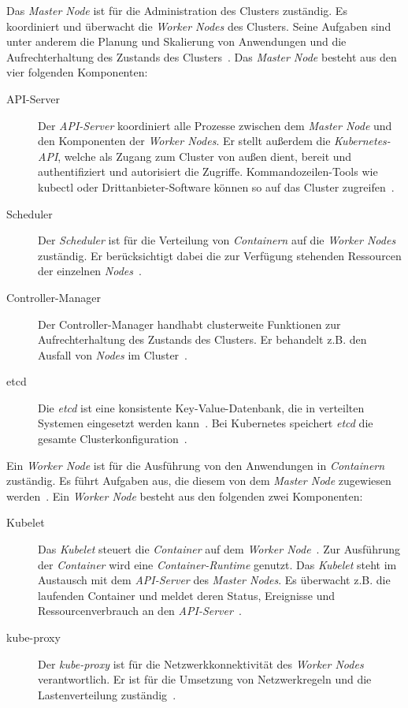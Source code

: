 Das \textit{Master Node} ist für die Administration des Clusters zuständig. Es koordiniert und überwacht die \textit{Worker Nodes} des Clusters.
Seine Aufgaben sind unter anderem die Planung und Skalierung von Anwendungen und die Aufrechterhaltung des Zustands des Clusters~\cite{kubernetes-cluster-vmware}.
Das \textit{Master Node} besteht aus den vier folgenden Komponenten:
\begin{description}
    \item[API-Server]
          Der \textit{API-Server} koordiniert alle Prozesse zwischen dem \textit{Master Node} und den Komponenten der \textit{Worker Nodes}.
          Er stellt außerdem die \textit{Kubernetes-API}, welche als Zugang zum Cluster von außen dient, bereit und authentifiziert und autorisiert die Zugriffe.
          Kommandozeilen-Tools wie kubectl oder Drittanbieter-Software können so auf das Cluster zugreifen~\cite{kubernetes-devopscube}.
    \item[Scheduler]
          Der \textit{Scheduler} ist für die Verteilung von \textit{Containern} auf die \textit{Worker Nodes} zuständig.
          Er berücksichtigt dabei die zur Verfügung stehenden Ressourcen der einzelnen \textit{Nodes}~\cite{kubernetes-cluster-ionos}.
    \item[Controller-Manager]
          Der Controller-Manager handhabt clusterweite Funktionen zur Aufrechterhaltung des Zustands des Clusters. Er behandelt z.B. den Ausfall von \textit{Nodes}
          im Cluster~\cite{kubernetes-in-action-introduction}.
    \item[etcd]
          Die \textit{etcd} ist eine konsistente Key-Value-Datenbank, die in verteilten Systemen eingesetzt werden kann~\cite{etcd-ibm}.
          Bei Kubernetes speichert \textit{etcd} die gesamte Clusterkonfiguration~\cite{kubernetes-in-action-introduction}.
\end{description}

Ein \textit{Worker Node} ist für die Ausführung von den Anwendungen in \textit{Containern} zuständig.
Es führt Aufgaben aus, die diesem von dem \textit{Master Node} zugewiesen werden~\cite{kubernetes-cluster-vmware}.
Ein \textit{Worker Node} besteht aus den folgenden zwei Komponenten:
\begin{description}
    \item[Kubelet]
          Das \textit{Kubelet} steuert die \textit{Container} auf dem \textit{Worker Node}~\cite{kubernetes-in-action-introduction}.
          Zur Ausführung der \textit{Container} wird eine \textit{Container-Runtime} genutzt.
          Das \textit{Kubelet} steht im Austausch mit dem \textit{API-Server} des \textit{Master Nodes}. Es überwacht z.B. die laufenden Container
          und meldet deren Status, Ereignisse und Ressourcenverbrauch an den \textit{API-Server}~\cite{kubernetes-in-action-chapter-11}.
    \item[kube-proxy]
          Der \textit{kube-proxy} ist für die Netzwerkkonnektivität des \textit{Worker Nodes} verantwortlich.
          Er ist für die Umsetzung von Netzwerkregeln und die Lastenverteilung zuständig~\cite{kubernetes-in-action-introduction,kubernetes-cluster-vmware}.
\end{description}

